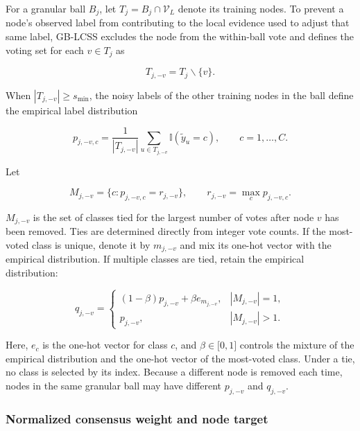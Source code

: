 \documentclass[10pt,letterpaper]{elsarticle}
\begin{document}
For a granular ball \(B_{j}\), let \(T_{j} = B_{j} \cap \mathcal{V}_{L}\) denote its training nodes. To prevent a node's observed label from contributing to the local evidence used to adjust that same label, GB-LCSS excludes the node from the within-ball vote and defines the voting set for each \(v \in T_{j}\) as

\begin{equation}\label{eq:7}
T_{j, - v} = T_{j}\backslash\{ v\}.
\end{equation}

When \(|T_{j, - v}| \geq s_{\min}\), the noisy labels of the other training nodes in the ball define the empirical label distribution

\begin{equation}\label{eq:8}
p_{j, - v,c} = \frac{1}{|T_{j, - v}|}\sum_{u \in T_{j, - v}}\mathbb{I}({\widetilde{y}}_{u} = c),\quad\quad c = 1,\ldots,C.
\end{equation}

Let

\begin{equation}\label{eq:9}
M_{j, - v} = \{ c:p_{j, - v,c} = r_{j, - v}\},\quad\quad r_{j, - v} = \max_{c}p_{j, - v,c}.
\end{equation}

\(M_{j, - v}\) is the set of classes tied for the largest number of votes after node \(v\) has been removed. Ties are determined directly from integer vote counts. If the most-voted class is unique, denote it by \(m_{j, - v}\) and mix its one-hot vector with the empirical distribution. If multiple classes are tied, retain the empirical distribution:

\begin{equation}\label{eq:10}
q_{j, - v} = \begin{cases}
(1 - \beta)p_{j, - v} + \beta e_{m_{j, - v}}, & |M_{j, - v}| = 1, \\
p_{j, - v}, & |M_{j, - v}| > 1.
\end{cases}
\end{equation}

Here, \(e_{c}\) is the one-hot vector for class \(c\), and \(\beta \in \lbrack 0,1\rbrack\) controls the mixture of the empirical distribution and the one-hot vector of the most-voted class. Under a tie, no class is selected by its index. Because a different node is removed each time, nodes in the same granular ball may have different \(p_{j, - v}\) and \(q_{j, - v}\).

\subsubsection{Normalized consensus weight and node target}\label{sec:3.4.2}
\end{document}
